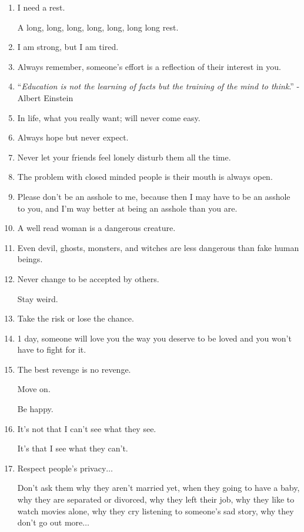 \documentclass{article}
\numberwithin{equation}{section}
\begin{document}
\begin{enumerate}
    Educate yourself - read, read, read.
    
    Be healthy \& look after your body.
    
    Don't wait for someone to love you; learn to love \textsc{Yourself} 1st.
    
    You'll be OK.
    \item I need a rest.
    
    A long, long, long, long, long, long long rest.
    \item I am strong, but I am tired.
    \item Always remember, someone's effort is a reflection of their interest in you.
    \item ``\textit{Education is not the learning of facts but the training of the mind to think}.'' - Albert Einstein
    \item In life, what you really want; will never come easy.
    \item Always hope but never expect.
    \item Never let your friends feel lonely disturb them all the time.
    \item The problem with closed minded people is their mouth is always open.
    \item Please don't be an asshole to me, because then I may have to be an asshole to you, and I'm way better at being an asshole than you are.
    \item A well read woman is a dangerous creature.
    \item Even devil, ghosts, monsters, and witches are less dangerous than fake human beings.
    \item Never change to be accepted by others.
    
    Stay weird.
    \item Take the risk or lose the chance.
    \item 1 day, someone will love you the way you deserve to be loved and you won't have to fight for it.
    \item The best revenge is no revenge.
    
    Move on.
    
    Be happy.
    \item It's not that I can't see what they see.
    
    It's that I see what they can't.
    \item Respect people's privacy$\ldots$
    
    Don't ask them why they aren't married yet, when they going to have a baby, why they are separated or divorced, why they left their job, why they like to watch movies alone, why they cry listening to someone's sad story, why they don't go out more$\ldots$
    

\end{enumerate}
\end{document}
